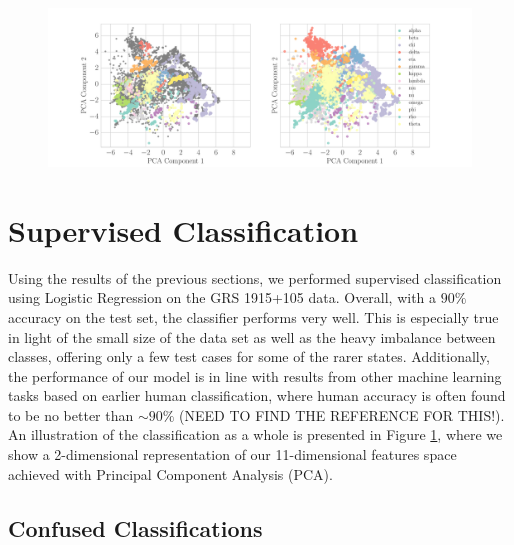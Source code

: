 \documentclass[12pt]{emulateapj}
\begin{document}
%
%


\begin{figure}[htbp]
\begin{center}
\includegraphics[width=\textwidth]{grs1915_supervised_pca_comparison.pdf}
\caption{} 
\label{fig:supervised_pca}
\end{center}
\end{figure}


\section{Supervised Classification}

Using the results of the previous sections, we performed supervised classification using Logistic Regression on the GRS 1915+105 data. 
Overall, with a $90\%$ accuracy on the test set, the classifier performs very well. This is especially true in light of the small size of the data set as well 
as the heavy imbalance between classes, offering only a few test cases for some of the rarer states. Additionally, the performance of our model is in 
line with results from other machine learning tasks based on earlier human classification, where human accuracy is often found to be no better than 
$\sim 90\%$ (NEED TO FIND THE REFERENCE FOR THIS!). An illustration of the classification as a whole is presented in Figure \ref{fig:supervised_pca}, 
where we show a 2-dimensional representation of our 11-dimensional features space achieved with Principal Component Analysis (PCA).

\subsection{Confused Classifications}
\label{sec:confusion}
\end{document}
